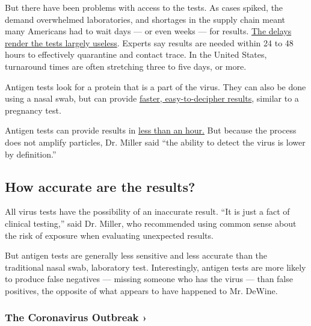 But there have been problems with access to the tests. As cases spiked,
the demand overwhelmed laboratories, and shortages in the supply chain
meant many Americans had to wait days --- or even weeks --- for results.
\href{https://www.nytimes.com/2020/08/04/us/virus-testing-delays.html}{The
delays render the tests largely useless}. Experts say results are needed
within 24 to 48 hours to effectively quarantine and contact trace. In
the United States, turnaround times are often stretching three to five
days, or more.

Antigen tests look for a protein that is a part of the virus. They can
also be done using a nasal swab, but can provide
\href{https://www.bd.com/en-us/offerings/capabilities/microbiology-solutions/point-of-care-testing/bd-veritor-sars-cov-2}{faster,
easy-to-decipher results}, similar to a pregnancy test.

Antigen tests can provide results in
\href{https://www.nytimes.com/2020/07/06/health/fast-coronavirus-tests.html}{less
than an hour.} But because the process does not amplify particles, Dr.
Miller said ``the ability to detect the virus is lower by definition.''

\hypertarget{how-accurate-are-the-results}{%
\subsection{How accurate are the
results?}\label{how-accurate-are-the-results}}

All virus tests have the possibility of an inaccurate result. ``It is
just a fact of clinical testing,'' said Dr. Miller, who recommended
using common sense about the risk of exposure when evaluating unexpected
results.

But antigen tests are generally less sensitive and less accurate than
the traditional nasal swab, laboratory test. Interestingly, antigen
tests are more likely to produce false negatives --- missing someone who
has the virus --- than false positives, the opposite of what appears to
have happened to Mr. DeWine.

\href{https://www.nytimes.com/news-event/coronavirus?action=click\&pgtype=Article\&state=default\&region=MAIN_CONTENT_3\&context=storylines_faq}{}

\hypertarget{the-coronavirus-outbreak-}{%
\subsubsection{The Coronavirus Outbreak
›}\label{the-coronavirus-outbreak-}}

